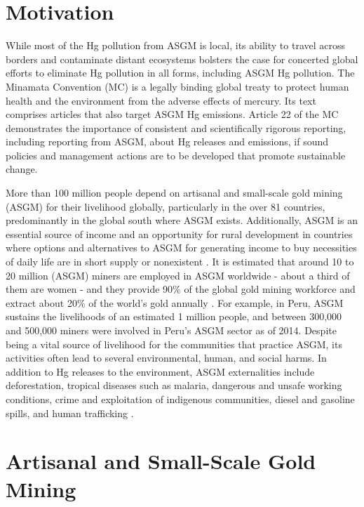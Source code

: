 \section{Motivation}
\begin{flushleft}
While most of the Hg pollution from ASGM is local, its ability to travel across borders and contaminate distant ecosystems bolsters the case for concerted global efforts to eliminate Hg pollution in all forms, including ASGM Hg pollution. The Minamata Convention (MC) is a legally binding global treaty to protect human health and the environment from the adverse effects of mercury. Its text comprises articles that also target ASGM Hg emissions\cite{unep_minamata_2013}. Article 22 of the MC demonstrates the importance of consistent and scientifically rigorous reporting, including reporting from ASGM, about Hg releases and emissions, if sound policies and management actions are to be developed that promote sustainable change. 
\end{flushleft}
\begin{flushleft}
More than 100 million people depend on artisanal and small-scale gold mining (ASGM) for their livelihood globally, particularly in the over 81 countries, predominantly in the global south where ASGM exists\cite{planetgold_planetgold_2021}. Additionally, ASGM is an essential source of income and an opportunity for rural development in countries where options and alternatives to ASGM for generating income to buy necessities of daily life are in short supply or nonexistent \cite{planetgold_planetgold_2021}. It is estimated that around 10 to 20 million (ASGM) miners are employed in ASGM worldwide - about a third of them are women - and they provide 90\% of the global gold mining workforce and extract about 20\% of the world's gold annually \cite{planetgold_planetgold_2021}. For example, in Peru, ASGM sustains the livelihoods of an estimated 1 million people, and between 300,000 and 500,000 miners were involved in Peru's ASGM sector as of 2014. Despite being a vital source of livelihood for the communities that practice ASGM, its activities often lead to several environmental, human, and social harms. In addition to Hg releases to the environment, ASGM externalities include deforestation, tropical diseases such as malaria, dangerous and unsafe working conditions, crime and exploitation of indigenous communities, diesel and gasoline spills, and human trafficking \cite{usaid_usaid_2020}. 
\end{flushleft}

\section{Artisanal and Small-Scale Gold Mining}


